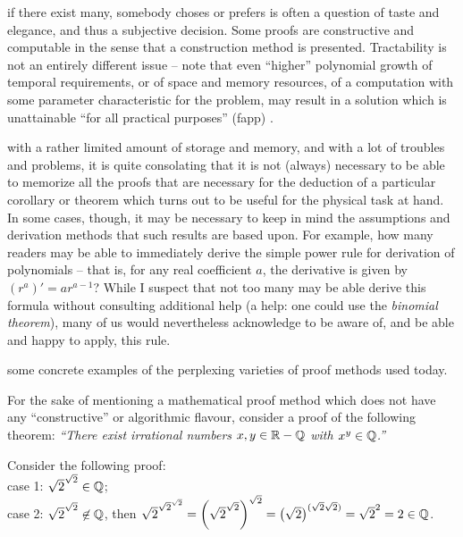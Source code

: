 if there exist many, somebody choses or prefers is often a question of taste and elegance, and thus a subjective decision.
Some proofs are constructive \cite{bridges-richman,bishop} and   computable \cite{aberth-80,Weihrauch,BHW08}
in the sense that a construction method is presented.
Tractability is not an entirely different issue \cite{kreisel,gandy2,pit:90}
--
note that even ``higher'' polynomial growth of temporal requirements, or of space and memory resources,
of a computation with some parameter characteristic for the problem,
may result in a solution which is unattainable ``for all practical purposes'' (fapp) \cite{bell-a}.

 with a rather limited amount of storage and memory,
and with a lot of troubles and problems, it is quite consolating that
it is not (always) necessary to be able to memorize all the proofs that are necessary for the deduction
of a particular
corollary or theorem which turns out to be useful for the physical task at hand.
In some cases, though, it may be necessary to keep in mind the assumptions and derivation
methods that such results are based upon.
For example, how many readers may be able to immediately derive
the simple power rule
for derivation of polynomials -- that is,  for any real coefficient $a$, the derivative is given by
$(r^a)' =a r^{a-1}$?
While I suspect that not too many may be able derive this formula without consulting additional help
(a help: one could use the {\em binomial theorem}),
many of us would nevertheless acknowledge to be aware of, and be able and happy to apply, this rule.




 some concrete examples of the perplexing varieties of proof methods used today.


 For the sake of mentioning a mathematical proof method which
 does not have any ``constructive'' or algorithmic flavour, consider a proof of the
 following theorem: {\em ``There exist
 irrational numbers $x,y\in {\Bbb R} - {\Bbb Q}$ with $x^y\in {\Bbb Q}$.''}

{\color{OliveGreen}
\bproof
{Consider the following proof:}\\
case 1: $ \sqrt{2} ^{ \sqrt{2} } \in {\Bbb Q} $;
  \\
case 2: $ \sqrt{2} ^{ \sqrt{2} } \not\in {\Bbb Q}$, then
$ \sqrt{2} ^{{ \sqrt{2} } ^{ \sqrt{2} }}
={\left({\sqrt{2} }^{ \sqrt{2} } \right)}^{ \sqrt{2} }
=\left(\sqrt{2}\right) ^{(  \sqrt{2}   \sqrt{2}  )} =
\sqrt{2} ^2 =2\in {\Bbb Q}$.
\eproof
}

